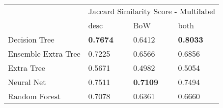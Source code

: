 \begin{tabular}{|l|l|l|l| }
\hline
 &  \multicolumn{3}{c|}{Jaccard Similarity Score - Multilabel} \\
\cline{2-4} & desc & BoW & both \\ \hline
Decision Tree       & {\bf 0.7674} & 0.6412 & {\bf 0.8033}\\
Ensemble Extra Tree & 0.7225 & 0.6566 & 0.6856\\
Extra Tree          & 0.5671 & 0.4982 & 0.5054\\
Neural Net          & 0.7511 & {\bf 0.7109} & 0.7494\\
Random Forest       & 0.7078 & 0.6361 & 0.6660\\
\hline
\end{tabular}